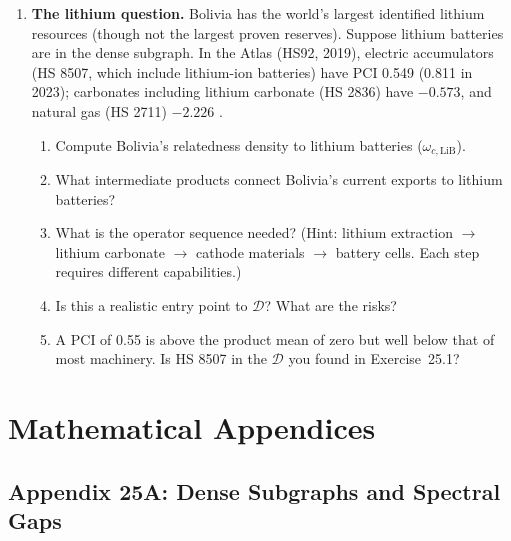 \documentclass[../structural_economics_book.tex]{subfiles}
\begin{document}
\begin{enumerate}[label=\textbf{25.\arabic*}, leftmargin=3em]
\item \textbf{The lithium question.} Bolivia has the world's largest identified lithium resources (though not the largest proven reserves). Suppose lithium batteries are in the dense subgraph. In the Atlas (HS92, 2019), electric accumulators (HS 8507, which include lithium-ion batteries) have PCI 0.549 (0.811 in 2023); carbonates including lithium carbonate (HS 2836) have $-0.573$, and natural gas (HS 2711) $-2.226$ \citep{growthlab2026atlas}.
\begin{enumerate}
\item Compute Bolivia's relatedness density to lithium batteries ($\omega_{c,\text{LiB}}$).
\item What intermediate products connect Bolivia's current exports to lithium batteries?
\item What is the operator sequence needed? (Hint: lithium extraction $\to$ lithium carbonate $\to$ cathode materials $\to$ battery cells. Each step requires different capabilities.)
\item Is this a realistic entry point to $\mathcal{D}$? What are the risks?
\item A PCI of 0.55 is above the product mean of zero but well below that of most machinery. Is HS 8507 in the $\mathcal{D}$ you found in Exercise~25.1?
\end{enumerate}
\end{enumerate}


\newpage
\section*{Mathematical Appendices}


\subsection*{Appendix 25A: Dense Subgraphs and Spectral Gaps}
\label{ch25:app:dense}
\end{document}
